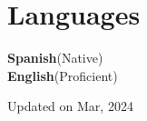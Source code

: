 \documentclass[letterpaper,11pt]{article}
\begin{document}
\section{Languages}
  \begin{itemize}[leftmargin=0.15in, label={}]
    \small{\item{
      \textbf{Spanish}{(Native)} \\
      \textbf{English}{(Proficient)} \\
    }}
 \end{itemize}


\vspace*{\fill}
\begin{center}
  Updated on Mar, 2024
\end{center}
\end{document}
